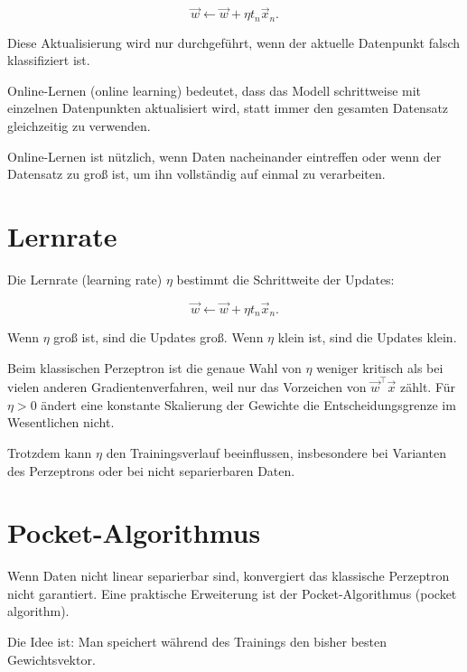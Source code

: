 \[
    \vec{w}
    \leftarrow
    \vec{w}
    +
    \eta t_n\vec{x}_n.
\]

Diese Aktualisierung wird nur durchgeführt, wenn der aktuelle Datenpunkt falsch klassifiziert ist.

\begin{definitionbox}
Online-Lernen (online learning) bedeutet, dass das Modell schrittweise mit einzelnen Datenpunkten aktualisiert wird, statt immer den gesamten Datensatz gleichzeitig zu verwenden.
\end{definitionbox}

\begin{notebox}
Online-Lernen ist nützlich, wenn Daten nacheinander eintreffen oder wenn der Datensatz zu groß ist, um ihn vollständig auf einmal zu verarbeiten.
\end{notebox}

\section{Lernrate}

Die Lernrate (learning rate) \(\eta\) bestimmt die Schrittweite der Updates:

\[
    \vec{w}
    \leftarrow
    \vec{w}
    +
    \eta t_n\vec{x}_n.
\]

Wenn \(\eta\) groß ist, sind die Updates groß.
Wenn \(\eta\) klein ist, sind die Updates klein.

Beim klassischen Perzeptron ist die genaue Wahl von \(\eta\) weniger kritisch als bei vielen anderen Gradientenverfahren, weil nur das Vorzeichen von \(\vec{w}^{\top}\vec{x}\) zählt.
Für \(\eta>0\) ändert eine konstante Skalierung der Gewichte die Entscheidungsgrenze im Wesentlichen nicht.

\begin{notebox}
Trotzdem kann \(\eta\) den Trainingsverlauf beeinflussen, insbesondere bei Varianten des Perzeptrons oder bei nicht separierbaren Daten.
\end{notebox}

\section{Pocket-Algorithmus}

Wenn Daten nicht linear separierbar sind, konvergiert das klassische Perzeptron nicht garantiert.
Eine praktische Erweiterung ist der Pocket-Algorithmus (pocket algorithm).

Die Idee ist:
Man speichert während des Trainings den bisher besten Gewichtsvektor.

